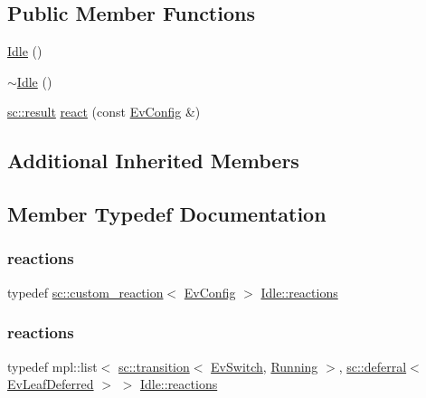 \subsection*{Public Member Functions}
\begin{DoxyCompactItemize}
\item 
\mbox{\hyperlink{struct_idle_a766bf3621da665c0f6a508084d1833e2}{Idle}} ()
\item 
\mbox{\hyperlink{struct_idle_a311e6fd824c33b1628911db3e2220449}{$\sim$\+Idle}} ()
\item 
\mbox{\hyperlink{namespaceboost_1_1statechart_abe807f6598b614d6d87bb951ecd92331}{sc\+::result}} \mbox{\hyperlink{struct_idle_a7ae48265e28cc7188491e2a38aec83d1}{react}} (const \mbox{\hyperlink{struct_ev_config}{Ev\+Config}} \&)
\end{DoxyCompactItemize}
\subsection*{Additional Inherited Members}


\subsection{Member Typedef Documentation}
\mbox{\label{struct_idle_ad2ecd64f82800bc98d1322ddd855d6c5}} 
\subsubsection{\texorpdfstring{reactions}{reactions}\hspace{0.1cm}{\footnotesize\ttfamily [1/2]}}
{\footnotesize\ttfamily typedef \mbox{\hyperlink{classboost_1_1statechart_1_1custom__reaction}{sc\+::custom\+\_\+reaction}}$<$ \mbox{\hyperlink{struct_ev_config}{Ev\+Config}} $>$ \mbox{\hyperlink{struct_idle_ad2ecd64f82800bc98d1322ddd855d6c5}{Idle\+::reactions}}}

\mbox{\label{struct_idle_a72d8c4793174bd822c39ccc36dc83409}} 
\subsubsection{\texorpdfstring{reactions}{reactions}\hspace{0.1cm}{\footnotesize\ttfamily [2/2]}}
{\footnotesize\ttfamily typedef mpl\+::list$<$ \mbox{\hyperlink{classboost_1_1statechart_1_1transition}{sc\+::transition}}$<$ \mbox{\hyperlink{struct_ev_switch}{Ev\+Switch}}, \mbox{\hyperlink{struct_running}{Running}} $>$, \mbox{\hyperlink{classboost_1_1statechart_1_1deferral}{sc\+::deferral}}$<$ \mbox{\hyperlink{struct_ev_leaf_deferred}{Ev\+Leaf\+Deferred}} $>$ $>$ \mbox{\hyperlink{struct_idle_ad2ecd64f82800bc98d1322ddd855d6c5}{Idle\+::reactions}}}



